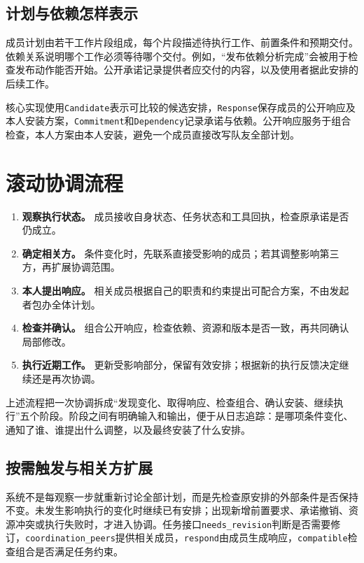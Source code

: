 \subsection{计划与依赖怎样表示}

成员计划由若干工作片段组成，每个片段描述待执行工作、前置条件和预期交付。依赖关系说明哪个工作必须等待哪个交付。例如，“发布依赖分析完成”会被用于检查发布动作能否开始。公开承诺记录提供者应交付的内容，以及使用者据此安排的后续工作。

核心实现使用\texttt{Candidate}表示可比较的候选安排，\texttt{Response}保存成员的公开响应及本人安装方案，\texttt{Commitment}和\texttt{Dependency}记录承诺与依赖。公开响应服务于组合检查，本人方案由本人安装，避免一个成员直接改写队友全部计划。

\hypertarget{ux6edaux52a8ux534fux8c03ux6d41ux7a0b}{%
\section{滚动协调流程}\label{ux6edaux52a8ux534fux8c03ux6d41ux7a0b}}

\begin{enumerate}
\def\labelenumi{\arabic{enumi}.}
\tightlist
\item
  \textbf{观察执行状态。}
  成员接收自身状态、任务状态和工具回执，检查原承诺是否仍成立。
\item
  \textbf{确定相关方。}
  条件变化时，先联系直接受影响的成员；若其调整影响第三方，再扩展协调范围。
\item
  \textbf{本人提出响应。}
  相关成员根据自己的职责和约束提出可配合方案，不由发起者包办全体计划。
\item
  \textbf{检查并确认。}
  组合公开响应，检查依赖、资源和版本是否一致，再共同确认局部修改。
\item
  \textbf{执行近期工作。}
  更新受影响部分，保留有效安排；根据新的执行反馈决定继续还是再次协调。
\end{enumerate}

上述流程把一次协调拆成“发现变化、取得响应、检查组合、确认安装、继续执行”五个阶段。阶段之间有明确输入和输出，便于从日志追踪：是哪项条件变化、通知了谁、谁提出什么调整，以及最终安装了什么安排。

\subsection{按需触发与相关方扩展}

系统不是每观察一步就重新讨论全部计划，而是先检查原安排的外部条件是否保持不变。未发生影响执行的变化时继续已有安排；出现新增前置要求、承诺撤销、资源冲突或执行失败时，才进入协调。任务接口\texttt{needs\_revision}判断是否需要修订，\texttt{coordination\_peers}提供相关成员，\texttt{respond}由成员生成响应，\texttt{compatible}检查组合是否满足任务约束。

